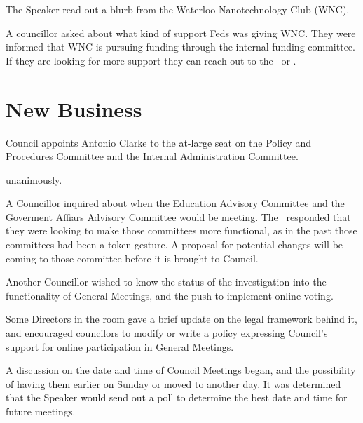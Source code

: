 
\begin{information}

    The Speaker read out a blurb from the Waterloo Nanotechnology Club (WNC). 

    A councillor asked about what kind of support Feds was giving WNC. They 
    were informed that WNC is pursuing funding through the internal funding 
    committee. If they are looking for more support they can reach out to 
    the \vpof\ or \vpi. 
\end{information}

\section*{New Business}


\begin{motion}
    \birt Council appoints Antonio Clarke to the at-large seat on the Policy
    and Procedures Committee and the Internal Administration Committee. 
    \movers{\brian}{\tomson}

    \carries unanimously.
\end{motion}

\begin{information}

    A Councillor inquired about when the Education Advisory Committee and the
    Goverment Affiars Advisory Committee would be meeting. The \vpe\ responded
    that they were looking to make those committees more functional, as in the
    past those committees had been a token gesture. A proposal for potential
    changes will be coming to those committee before it is brought to Council. 

    Another Councillor wished to know the status of the investigation into the 
    functionality of General Meetings, and the push to implement online voting.
    
    Some Directors in the room gave a brief update on the legal framework behind
    it, and encouraged councilors to modify or write a policy expressing
    Council's support for online participation in General Meetings. 

\end{information}

\begin{information}

    A discussion on the date and time of Council Meetings began, 
    and the possibility of having them earlier on Sunday or moved to another
    day. It was determined that the Speaker would send out a poll
    to determine the best date and time for future meetings. 

\end{information}


